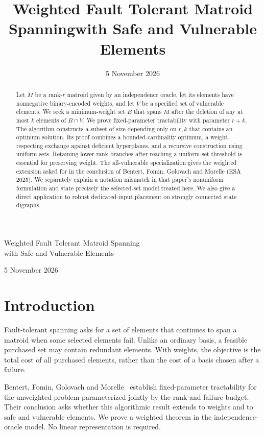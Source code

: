 \documentclass[11pt]{article}
\title{Weighted Fault Tolerant Matroid Spanning\newline with Safe and Vulnerable Elements}
\author{}
\date{5 November 2026}
\theoremstyle{definition}\newtheorem{definition}[theorem]{Definition}
\theoremstyle{remark}\newtheorem{remark}[theorem]{Remark}
\begin{document}
\begin{center}
{\LARGE Weighted Fault Tolerant Matroid Spanning\\[0.3em]
with Safe and Vulnerable Elements\par}
\vspace{1em}
5 November 2026
\end{center}
\vspace{0.7em}
\begin{abstract}
Let $M$ be a rank-$r$ matroid given by an independence oracle, let its elements have nonnegative binary-encoded weights, and let $V$ be a specified set of vulnerable elements. We seek a minimum-weight set $B$ that spans $M$ after the deletion of any at most $k$ elements of $B\cap V$. We prove fixed-parameter tractability with parameter $r+k$. The algorithm constructs a subset of size depending only on $r,k$ that contains an optimum solution. Its proof combines a bounded-cardinality optimum, a weight-respecting exchange against deficient hyperplanes, and a recursive construction using uniform sets. Retaining lower-rank branches after reaching a uniform-set threshold is essential for preserving weight. The all-vulnerable specialization gives the weighted extension asked for in the conclusion of Bentert, Fomin, Golovach and Morelle (ESA 2025). We separately explain a notation mismatch in that paper's nonuniform formulation and state precisely the selected-set model treated here. We also give a direct application to robust dedicated-input placement on strongly connected state digraphs.
\end{abstract}

\section{Introduction}
Fault-tolerant spanning asks for a set of elements that continues to span a matroid when some selected elements fail. Unlike an ordinary basis, a feasible purchased set may contain redundant elements. With weights, the objective is the total cost of all purchased elements, rather than the cost of a basis chosen after a failure.

Bentert, Fomin, Golovach and Morelle~\cite{BFGL} establish fixed-parameter tractability for the unweighted problem parameterized jointly by the rank and failure budget. Their conclusion asks whether this algorithmic result extends to weights and to safe and vulnerable elements. We prove a weighted theorem in the independence-oracle model. No linear representation is required.
\end{document}
